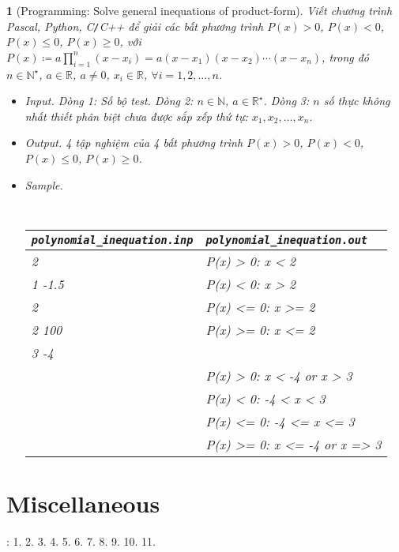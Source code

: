 \documentclass{article}
\newtheorem{baitoan}{}
\begin{document}
\begin{baitoan}[Programming: Solve general inequations of product-form]
	Viết chương trình {\sf Pascal, Python, C{\tt/}C++} để giải các bất phương trình $P(x) > 0$, $P(x) < 0$, $P(x)\le0$, $P(x)\ge0$, với $P(x)\coloneqq a\prod_{i=1}^n (x - x_i) = a(x - x_1)(x - x_2)\cdots(x - x_n)$, trong đó $n\in\mathbb{N}^\star$, $a\in\mathbb{R}$, $a\ne0$, $x_i\in\mathbb{R}$, $\forall i = 1,2,\ldots,n$.
	\begin{itemize}
		\item {\sf Input.} Dòng 1: Số bộ test. Dòng 2: $n\in\mathbb{N}$, $a\in\mathbb{R}^\star$. Dòng 3: $n$ số thực không nhất thiết phân biệt chưa được sắp xếp thứ tự: $x_1,x_2,\ldots,x_n$. 
		\item {\sf Output.} 4 tập nghiệm của 4 bất phương trình $P(x) > 0$, $P(x) < 0$, $P(x)\le0$, $P(x)\ge0$.
		\item {\sf Sample.}
		\begin{table}[H]
			\centering\tt
			\begin{tabular}{|l|l|}
				\hline
				\verb|polynomial_inequation.inp| & \verb|polynomial_inequation.out| \\
				\hline
				2 & P(x) > 0: x < 2 \\
				1 -1.5 & P(x) < 0: x > 2 \\
				2 & P(x) <= 0: x >= 2 \\
				2 100 & P(x) >= 0: x <= 2 \\
				3 -4 & \\
				& P(x) > 0: x < -4 or x > 3 \\
				& P(x) < 0: -4 < x < 3 \\
				& P(x) <= 0: -4 <= x <= 3 \\
				& P(x) >= 0: x <= -4 or x => 3 \\
				\hline
			\end{tabular}
		\end{table}
	\end{itemize}
\end{baitoan}


\section{Miscellaneous}
\cite[BTCCII, pp. 42--41]{SGK_Toan_9_Canh_Dieu_tap_1}: 1. 2. 3. 4. 5. 6. 7. 8. 9. 10. 11.


\printbibliography[heading=bibintoc]
	
\end{document}
